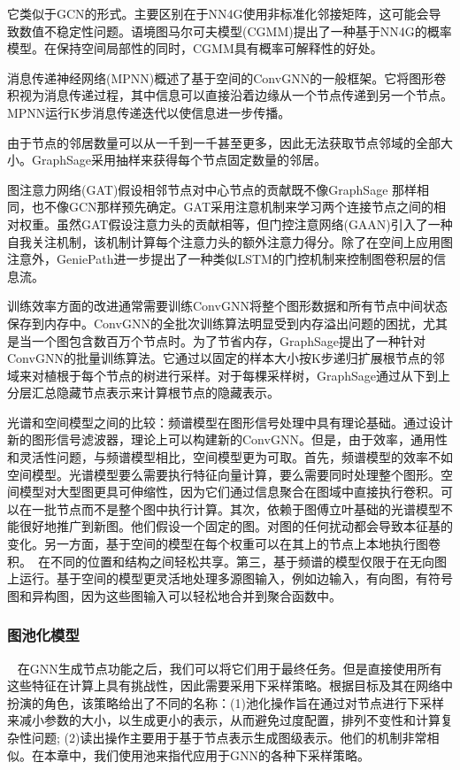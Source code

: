 它类似于GCN的形式。主要区别在于NN4G使用非标准化邻接矩阵，这可能会导致数值不稳定性问题。语境图马尔可夫模型(CGMM)提出了一种基于NN4G的概率模型。在保持空间局部性的同时，CGMM具有概率可解释性的好处。

消息传递神经网络(MPNN)概述了基于空间的ConvGNN的一般框架。它将图形卷积视为消息传递过程，其中信息可以直接沿着边缘从一个节点传递到另一个节点。MPNN运行K步消息传递迭代以使信息进一步传播。

由于节点的邻居数量可以从一千到一千甚至更多，因此无法获取节点邻域的全部大小。GraphSage采用抽样来获得每个节点固定数量的邻居。

图注意力网络(GAT)假设相邻节点对中心节点的贡献既不像GraphSage 那样相同，也不像GCN那样预先确定。GAT采用注意机制来学习两个连接节点之间的相对权重。虽然GAT假设注意力头的贡献相等，但门控注意网络(GAAN)引入了一种自我关注机制，该机制计算每个注意力头的额外注意力得分。除了在空间上应用图注意外，GeniePath进一步提出了一种类似LSTM的门控机制来控制图卷积层的信息流。

训练效率方面的改进通常需要训练ConvGNN将整个图形数据和所有节点中间状态保存到内存中。ConvGNN的全批次训练算法明显受到内存溢出问题的困扰，尤其是当一个图包含数百万个节点时。为了节省内存，GraphSage提出了一种针对ConvGNN的批量训练算法。它通过以固定的样本大小按K步递归扩展根节点的邻域来对植根于每个节点的树进行采样。对于每棵采样树，GraphSage通过从下到上分层汇总隐藏节点表示来计算根节点的隐藏表示。

光谱和空间模型之间的比较：频谱模型在图形信号处理中具有理论基础。通过设计新的图形信号滤波器，理论上可以构建新的ConvGNN。但是，由于效率，通用性和灵活性问题，与频谱模型相比，空间模型更为可取。首先，频谱模型的效率不如空间模型。光谱模型要么需要执行特征向量计算，要么需要同时处理整个图形。空间模型对大型图更具可伸缩性，因为它们通过信息聚合在图域中直接执行卷积。可以在一批节点而不是整个图中执行计算。其次，依赖于图傅立叶基础的光谱模型不能很好地推广到新图。他们假设一个固定的图。对图的任何扰动都会导致本征基的变化。另一方面，基于空间的模型在每个权重可以在其上的节点上本地执行图卷积。 在不同的位置和结构之间轻松共享。第三，基于频谱的模型仅限于在无向图上运行。基于空间的模型更灵活地处理多源图输入，例如边输入，有向图，有符号图和异构图，因为这些图输入可以轻松地合并到聚合函数中。


\subsubsection{图池化模型}
  在GNN生成节点功能之后，我们可以将它们用于最终任务。但是直接使用所有这些特征在计算上具有挑战性，因此需要采用下采样策略。根据目标及其在网络中扮演的角色，该策略给出了不同的名称：(1)池化操作旨在通过对节点进行下采样来减小参数的大小，以生成更小的表示，从而避免过度配置，排列不变性和计算复杂性问题; (2)读出操作主要用于基于节点表示生成图级表示。他们的机制非常相似。在本章中，我们使用池来指代应用于GNN的各种下采样策略。

